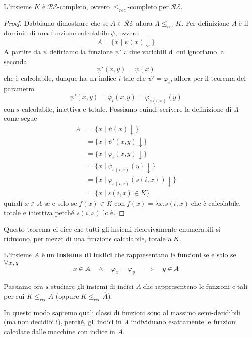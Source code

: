 \begin{theorem}
	L'insieme $K$ è $\mathcal{RE}$-completo, ovvero
	$\leq_{rec}$-completo per $\mathcal{RE}$.
	\begin{proof}
		Dobbiamo dimostrare che se $A \in \mathcal{RE}$ allora
		$A \leq_{rec} K$. Per definizione $A$ è il dominio di
		una funzione calcolabile $\psi$, ovvero
		\[ A = \{ x \mid \psi (x) \downarrow \} \]
		A partire da $\psi$ definiamo la funzione $\psi'$ a due
		variabili di cui ignoriamo la seconda
		\[ \psi' (x, y) = \psi(x) \]
		che è calcolabile, dunque ha un indice $i$ tale che
		$\psi' = \varphi_i$, allora per il teorema del parametro
		\[ \psi' (x, y) = \varphi_i(x, y) = \varphi_{s(i, x)} (y) \]
		con $s$ calcolabile, iniettiva e totale. Possiamo quindi
		scrivere la definizione di $A$ come segue
		\begin{align*}
			A & = \{ x \mid \psi(x) \downarrow \}                    \\
			  & = \{ x \mid \psi'(x, y) \downarrow \}                \\
			  & = \{ x \mid \varphi_i(x, y) \downarrow \}            \\
			  & = \{ x \mid \varphi_{s(i, x)}(y) \downarrow \}       \\
			  & = \{ x \mid \varphi_{s(i, x)}(s(i, x)) \downarrow \} \\
			  & = \{ x \mid s(i, x) \in K \}
		\end{align*}
		quindi $x \in A$ se e solo se $f(x) \in K$ con
		$f(x) = \lambda x . s(i, x)$ che è calcolabile, totale
		e iniettiva perché $s(i, x)$ lo è.
	\end{proof}
\end{theorem}

Questo teorema ci dice che tutti gli insiemi ricorsivamente
enumerabili si riducono, per mezzo di una funzione calcolabile,
totale a $K$.

\begin{definition}
	L'insieme $A$ è un \textbf{insieme di indici} che
	rappresentano le funzioni se e solo se $\forall x, y$
	\[
		x \in A \quad \land \quad \varphi_x = \varphi_y
		\quad \implies \quad y \in A
	\]
\end{definition}

Passiamo ora a studiare gli insiemi di indici $A$ che
rappresentano le funzioni e tali per cui $K \leq_{rec} A$ (oppure
$K \leq_{rec} \overline{A}$).

In questo modo sapremo quali classi di funzioni sono al massimo
semi-decidibili (ma non decidibili), perché, gli indici in $A$
individuano esattamente le funzioni calcolate dalle macchine con
indice in $A$.

